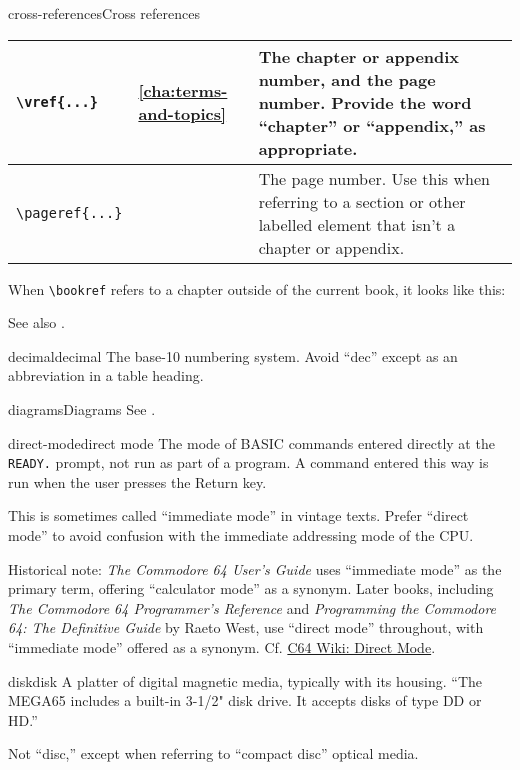 \begin{sgentry}{cross-references}{Cross references}
\begin{center}
\begin{tabular}{|l|l|p{6cm}|}
        \texttt{{\textbackslash}vref\{...\}} &
        \vref{cha:terms-and-topics} &
        The chapter or appendix number, and the page number. Provide the word ``chapter'' or ``appendix,'' as appropriate. \\
        \hline

        \texttt{{\textbackslash}pageref\{...\}} &
        \pageref{cha:terms-and-topics} &
        The page number. Use this when referring to a section or other labelled element that isn't a chapter or appendix. \\
        \hline
    \end{tabular}
    \end{center}

    When \texttt{{\textbackslash}bookref} refers to a chapter outside of the current book, it looks like this: 

    See also .
\end{sgentry}

\begin{sgentry}{decimal}{decimal}
    The base-10 numbering system. Avoid ``dec'' except as an abbreviation in a table heading.
\end{sgentry}

\begin{sgentry}{diagrams}{Diagrams}
    See .
\end{sgentry}

\begin{sgentry}{direct-mode}{direct mode}
    The mode of BASIC commands entered directly at the \texttt{READY.} prompt, not run as part of a program. A command entered this way is run when the user presses the Return key.

    This is sometimes called ``immediate mode'' in vintage texts. Prefer ``direct mode'' to avoid confusion with the immediate addressing mode of the CPU.

    Historical note: \emph{The Commodore 64 User's Guide} uses ``immediate mode'' as the primary term, offering ``calculator mode'' as a synonym. Later books, including \emph{The Commodore 64 Programmer's Reference} and \emph{Programming the Commodore 64: The Definitive Guide} by Raeto West, use ``direct mode'' throughout, with ``immediate mode'' offered as a synonym. Cf. \href{https://www.c64-wiki.com/wiki/Direct_Mode}{C64 Wiki: Direct Mode}.
\end{sgentry}

\begin{sgentry}{disk}{disk}
    A platter of digital magnetic media, typically with its housing. ``The MEGA65 includes a built-in 3-1/2" disk drive. It accepts disks of type DD or HD.''

    Not ``disc,'' except when referring to ``compact disc'' optical media.
\end{sgentry}

